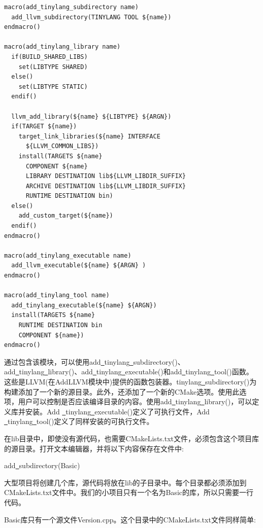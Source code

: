 \begin{lstlisting}[caption={}]
macro(add_tinylang_subdirectory name)
  add_llvm_subdirectory(TINYLANG TOOL ${name})
endmacro()

macro(add_tinylang_library name)
  if(BUILD_SHARED_LIBS)
    set(LIBTYPE SHARED)
  else()
    set(LIBTYPE STATIC)
  endif()
  
  llvm_add_library(${name} ${LIBTYPE} ${ARGN})
  if(TARGET ${name})
    target_link_libraries(${name} INTERFACE
      ${LLVM_COMMON_LIBS})
    install(TARGETS ${name}
      COMPONENT ${name}
      LIBRARY DESTINATION lib${LLVM_LIBDIR_SUFFIX}
      ARCHIVE DESTINATION lib${LLVM_LIBDIR_SUFFIX}
      RUNTIME DESTINATION bin)
  else()
    add_custom_target(${name})
  endif()
endmacro()

macro(add_tinylang_executable name)
  add_llvm_executable(${name} ${ARGN} )
endmacro()

macro(add_tinylang_tool name)
  add_tinylang_executable(${name} ${ARGN})
  install(TARGETS ${name}
    RUNTIME DESTINATION bin
    COMPONENT ${name})
endmacro()
\end{lstlisting}

通过包含该模块，可以使用add\underline{~}tinylang\underline{~}subdirectory()、add\underline{~}tinylang\underline{~}library()、add\underline{~}tinylang\underline{~}exe\allowbreak cutable()和add\underline{~}tinylang\underline{~}tool()函数。这些是LLVM(在AddLLVM模块中)提供的函数包装器。tinylang\underline{~}subdirectory()为构建添加了一个新的源目录。此外，还添加了一个新的CMake选项。使用此选项，用户可以控制是否应该编译目录的内容。使用add\underline{~}tinylang\underline{~}library()，可以定义库并安装。Add \underline{~}tinylang\underline{~}executable()定义了可执行文件，Add \underline{~}tinylang\underline{~}tool()定义了同样安装的可执行文件。\par

在lib目录中，即使没有源代码，也需要CMakeLists.txt文件，必须包含这个项目库的源目录。打开文本编辑器，并将以下内容保存在文件中:\par

\begin{tcolorbox}[colback=white,colframe=black]
add\underline{~}subdirectory(Basic)
\end{tcolorbox}

大型项目将创建几个库，源代码将放在lib的子目录中。每个目录都必须添加到CMakeLists.txt文件中。我们的小项目只有一个名为Basic的库，所以只需要一行代码。\par

Basic库只有一个源文件Version.cpp。这个目录中的CMakeLists.txt文件同样简单:\par

